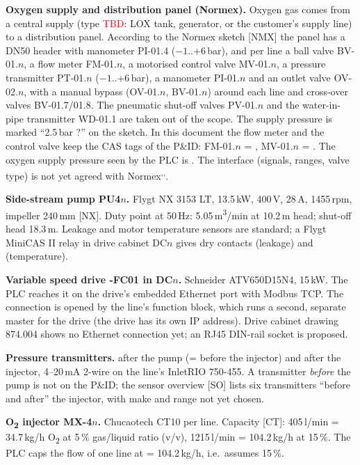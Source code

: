 \documentclass[11pt,a4paper]{article}
\newcommand{\Otwo}{O\textsubscript{2}}
\newcommand{\TBD}{\textcolor{red}{TBD}}
\begin{document}
\textbf{Oxygen supply and distribution panel (Normex).} Oxygen gas comes from a central
supply (type \TBD: LOX tank, generator, or the customer's supply line) to a distribution panel.
According to the Normex sketch [NMX] the panel has a DN50 header with manometer PI-01.4
($-1$..+6\,bar), and per line a ball valve BV-01.$n$, a flow meter FM-01.$n$, a motorised control
valve MV-01.$n$, a pressure transmitter PT-01.$n$ ($-1$..+6\,bar), a manometer PI-01.$n$ and an
outlet valve OV-02.$n$, with a manual bypass (OV-01.$n$, BV-01.$n$) around each line and cross-over
valves BV-01.7/01.8. The pneumatic shut-off valves PV-01.$n$ and the water-in-pipe transmitter
WD-01.1 are taken out of the scope. The supply pressure is marked ``2.5\,bar ?'' on the sketch.
In this document the flow meter and the control valve keep the CAS tags of the P\&ID: FM-01.$n$ =
, MV-01.$n$ = . The oxygen supply pressure seen by the PLC is .
The interface (signals, ranges, valve type) is not yet agreed with Normex\textsuperscript{,}\textsuperscript{,}.

\textbf{Side-stream pump PU4$n$.} Flygt NX 3153 LT, 13.5\,kW, 400\,V, 28\,A, 1455\,rpm, impeller
240\,mm [NX]. Duty point at 50\,Hz: 5.05\,m\textsuperscript{3}/min at 10.2\,m head; shut-off
head 18.3\,m. Leakage and motor temperature sensors are standard; a Flygt MiniCAS II relay in
drive cabinet DC$n$ gives dry contacts  (leakage) and  (temperature).

\textbf{Variable speed drive -FC01 in DC$n$.} Schneider ATV650D15N4, 15\,kW. The PLC
reaches it on the drive's embedded Ethernet port with Modbus TCP. The connection is opened by the
line's  function block, which runs a second, separate 
master for the drive (the drive has its own IP address). Drive cabinet drawing 874.004 shows no
Ethernet connection yet; an RJ45 DIN-rail socket is proposed.

\textbf{Pressure transmitters.}  after the pump (= before the injector) and
 after the injector, 4--20\,mA 2-wire on the line's InletRIO 750-455. A transmitter
\emph{before} the pump is not on the P\&ID; the sensor overview [SO] lists six transmitters
``before and after'' the injector, with make and range not yet chosen.

\textbf{\Otwo{} injector MX-4$n$.} Chucaotech CT10 per line. Capacity [CT]: 405\,l/min =
34.7\,kg/h \Otwo{} at 5\,\% gas/liquid ratio (v/v), 1215\,l/min = 104.2\,kg/h at 15\,\%. The PLC
caps the flow of one line at  = 104.2\,kg/h, i.e.\ assumes 15\,\%.
\end{document}
